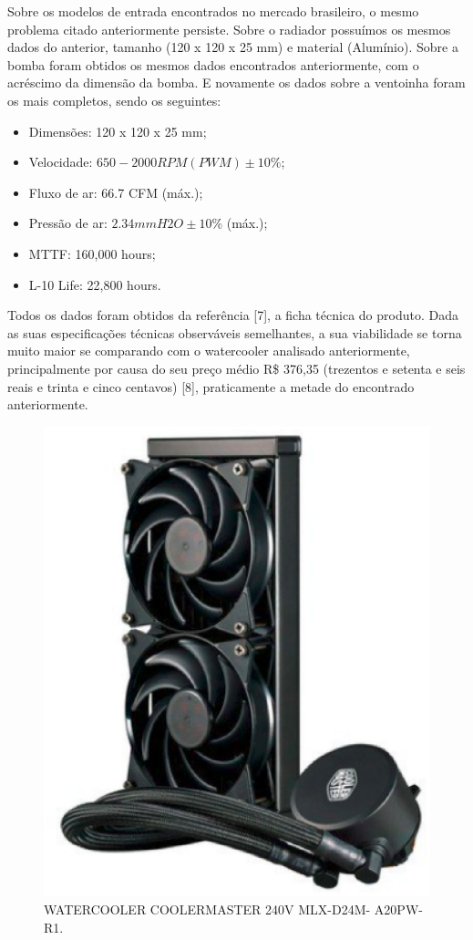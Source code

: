 Sobre os modelos de entrada encontrados no mercado brasileiro, o mesmo problema citado anteriormente persiste. Sobre o radiador possuímos os mesmos dados do anterior, tamanho (120 x 120 x 25 mm) e material (Alumínio). Sobre a bomba foram obtidos os mesmos dados encontrados anteriormente, com o acréscimo da dimensão da bomba. E novamente os dados sobre a ventoinha foram os mais completos, sendo os seguintes:
\begin{itemize}
\item Dimensões: 120 x 120 x 25 mm;
\item Velocidade: $650 - 2000 RPM (PWM) \pm 10$\%;
\item Fluxo de ar: 66.7 CFM (máx.);
\item Pressão de ar: $2.34 mmH2O \pm 10$\% (máx.);
\item MTTF: 160,000 hours;
\item L-10 Life: 22,800 hours.
\end{itemize}
Todos os dados foram obtidos da referência [7], a ficha técnica do produto. Dada as suas especificações técnicas observáveis semelhantes, a sua viabilidade se torna muito maior se comparando com o watercooler analisado anteriormente, principalmente por causa do seu preço médio R\$ 376,35 (trezentos e setenta e seis reais e trinta e cinco centavos) [8], praticamente a metade do encontrado anteriormente.

\begin{figure}[!htb]                                                               
   \centering                                                                      
   \includegraphics[scale=0.4, keepaspectratio=true]{figuras/watercooler3.eps}
   \caption{WATERCOOLER COOLERMASTER 240V MLX-D24M- A20PW-R1.}               
\end{figure}

